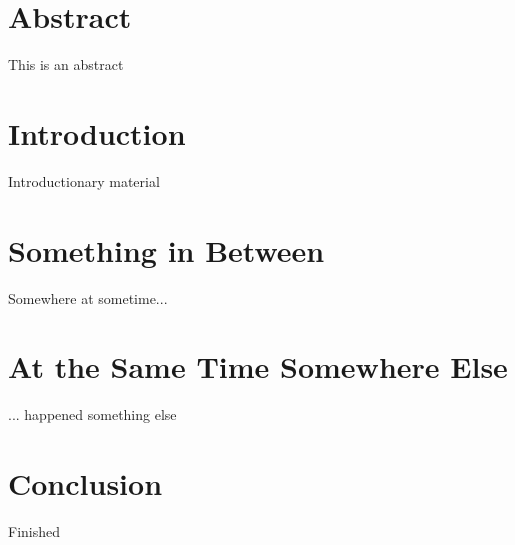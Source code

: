\documentclass{ituthesis}
\begin{document}

\frontmatter

\thetitlepage
\newpage

\chapter*{Abstract}
This is an abstract

\cleardoublepage
\setcounter{tocdepth}{1}
\tableofcontents

\mainmatter
\chapter{Introduction}
Introductionary material

\chapter{Something in Between}
Somewhere at sometime...

\chapter{At the Same Time Somewhere Else}
... happened something else

\chapter{Conclusion}
Finished
\end{document}
